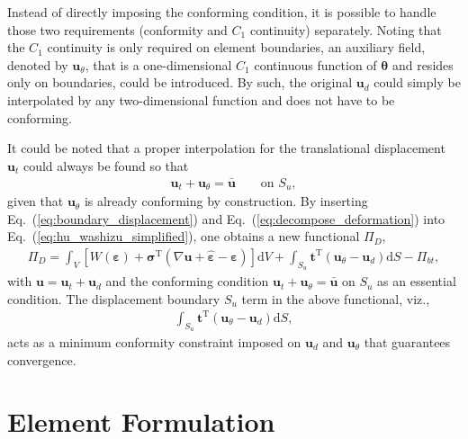 \documentclass[3p,sort&compress,review,11pt]{elsarticle}
\newcommand*{\md}[1]{\mathrm{d}#1}
\newcommand*{\mT}{\mathrm{T}}
\newcommand*{\eqsref}[1]{Eq.~(\ref{#1})}
\begin{document}
Instead of directly imposing the conforming condition, it is possible to handle those two requirements (conformity and $C_1$ continuity) separately. Noting that the $C_1$ continuity is only required on element boundaries, an auxiliary field, denoted by $\mathbold{u}_\theta$, that is a one-dimensional $C_1$ continuous function of $\mathbold{\theta}$ and resides only on boundaries, could be introduced. By such, the original $\mathbold{u}_d$ could simply be interpolated by any two-dimensional function and does not have to be conforming.

It could be noted that a proper interpolation for the translational displacement $\mathbold{u}_t$ could always be found so that
\begin{gather}\label{eq:boundary_displacement}
\mathbold{u}_t+\mathbold{u}_\theta=\bar{\mathbold{u}}\qquad\text{on $S_u$},
\end{gather}
given that $\mathbold{u}_\theta$ is already conforming by construction. By inserting \eqsref{eq:boundary_displacement} and \eqsref{eq:decompose_deformation} into \eqsref{eq:hu_washizu_simplified}, one obtains a new functional $\varPi_D$,
\begin{gather}\label{eq:modified_principle}
\varPi_D=\int_V\left[W\left(\mathbold{\varepsilon}\right)+\mathbold{\sigma}^\mT\left(\nabla\mathbold{u}+\hat{\mathbold{\varepsilon}}-\mathbold{\varepsilon}\right)\right]\md{V}+\int_{S_u}\mathbold{t}^\mT\left(\mathbold{u}_\theta-\mathbold{u}_d\right)\md{S}-\varPi_{bt},
\end{gather}
with $\mathbold{u}=\mathbold{u}_t+\mathbold{u}_d$ and the conforming condition $\mathbold{u}_t+\mathbold{u}_\theta=\bar{\mathbold{u}}$ on $S_u$ as an essential condition. The displacement boundary $S_u$ term in the above functional, viz.,
\begin{gather}\label{eq:constraint}
\int_{S_u}\mathbold{t}^\mT\left(\mathbold{u}_\theta-\mathbold{u}_d\right)\md{S},
\end{gather}
acts as a minimum conformity constraint imposed on $\mathbold{u}_d$ and $\mathbold{u}_\theta$ that guarantees convergence.
\section{Element Formulation}
\end{document}
